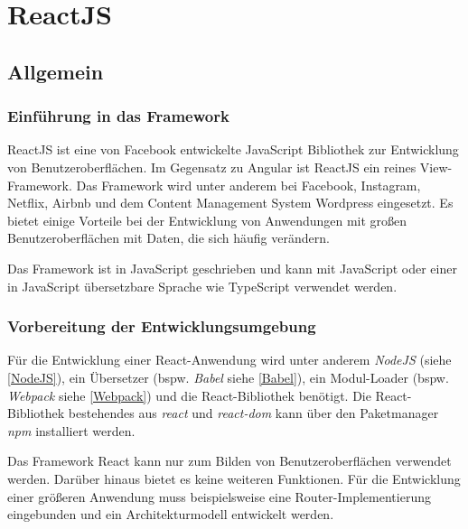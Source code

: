 \chapter{ReactJS}
\label{ch:reactJS}

\section{Allgemein}

\subsection{Einführung in das Framework}

ReactJS ist eine von Facebook entwickelte JavaScript Bibliothek zur Entwicklung von Benutzeroberflächen. Im Gegensatz zu Angular ist ReactJS ein reines View-Framework. Das Framework wird unter anderem bei Facebook, Instagram, Netflix, Airbnb und dem Content Management System Wordpress eingesetzt. Es bietet einige Vorteile bei der Entwicklung von Anwendungen mit großen Benutzeroberflächen mit Daten, die sich häufig verändern. 

Das Framework ist in JavaScript geschrieben und kann mit JavaScript oder einer in JavaScript übersetzbare Sprache wie TypeScript verwendet werden.\autocites[vgl.][1\psqq]{Gackenheimer.2015}[vgl.][3\psqq]{Zeigermann.2016}

\subsection{Vorbereitung der Entwicklungsumgebung}
Für die Entwicklung einer React-Anwendung wird unter anderem \textit{NodeJS} (siehe \autoref{NodeJS}), ein Übersetzer (bspw. \textit{Babel} siehe \autoref{Babel}), ein Modul-Loader (bspw. \textit{Webpack} siehe \autoref{Webpack}) und die React-Bibliothek benötigt. Die React-Bibliothek bestehendes aus \textit{react} und \textit{react-dom} kann über den Paketmanager \textit{npm} installiert werden. \autocites[vgl.][92\psqq]{Stefanov.2017}[vgl.][8\psqq]{Zeigermann.2016}

Das Framework React kann nur zum Bilden von Benutzeroberflächen verwendet werden. Darüber hinaus bietet es keine weiteren Funktionen. Für die Entwicklung einer größeren Anwendung muss beispielsweise eine Router-Implementierung eingebunden und ein Architekturmodell entwickelt werden.
 \autocites[vgl.][8]{Zeigermann.2016}




